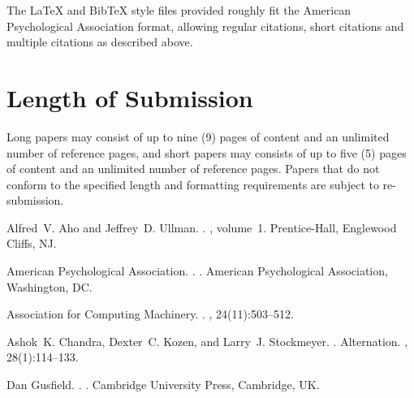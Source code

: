 \documentclass[11pt]{article}
\begin{document}
The \LaTeX{} and Bib\TeX{} style files provided roughly fit the
American Psychological Association format, allowing regular citations,
short citations and multiple citations as described above.


\section{Length of Submission}
\label{sec:length}

Long papers may consist of up to nine (9) pages of content and an unlimited number of reference pages, 
and short papers may consists of up to five (5) pages of content and an unlimited number of reference pages. 
Papers that do not conform to the specified length and formatting requirements are subject to re-submission.



\begin{thebibliography}{}

Alfred~V. Aho and Jeffrey~D. Ullman.
.
, volume~1.
\newblock Prentice-{Hall}, Englewood Cliffs, NJ.

{American Psychological Association}.
.
.
\newblock American Psychological Association, Washington, DC.

{Association for Computing Machinery}.
.
, 24(11):503--512.

Ashok~K. Chandra, Dexter~C. Kozen, and Larry~J. Stockmeyer.
.
\newblock Alternation.
,
  28(1):114--133.

Dan Gusfield.
.
.
\newblock Cambridge University Press, Cambridge, UK.

\end{thebibliography}
\end{document}
